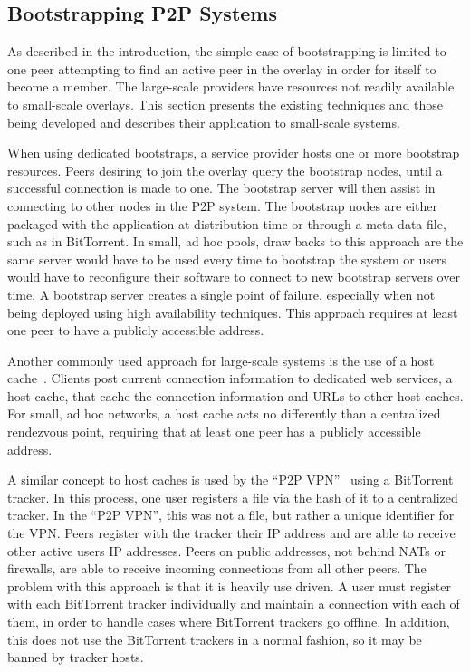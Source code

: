 \documentclass[conference]{IEEEtran}
\begin{document}
\subsection{Bootstrapping P2P Systems}

As described in the introduction, the simple case of bootstrapping is limited
to one peer attempting to find an active peer in the overlay in order for
itself to become a member.  The large-scale providers have resources not
readily available to small-scale overlays.  This section presents the existing
techniques and those being developed and describes their application to
small-scale systems.

When using dedicated bootstraps, a service provider hosts one or more bootstrap
resources.  Peers desiring to join the overlay query the bootstrap nodes, until
a successful connection is made to one.  The bootstrap server will then assist
in connecting to other nodes in the P2P system.  The bootstrap nodes are either
packaged with the application at distribution time or through a meta data file,
such as in BitTorrent.  In small, ad hoc pools, draw backs to this approach are
the same server would have to be used every time to bootstrap the system or
users would have to reconfigure their software to connect to new bootstrap
servers over time.  A bootstrap server creates a single point of failure,
especially when not being deployed using high availability techniques.  This
approach requires at least one peer to have a publicly accessible address.

Another commonly used approach for large-scale systems is the use of a host
cache~\cite{host_cache}.  Clients post current connection information to
dedicated web services, a host cache, that cache the connection information and
URLs to other host caches.  For small, ad hoc networks, a host cache acts no
differently than a centralized rendezvous point, requiring that at least one
peer has a publicly accessible address.

A similar concept to host caches is used by the ``P2P VPN''~\cite{p2pvpn} using
a BitTorrent tracker.  In this process, one user registers a file via the hash
of it to a centralized tracker.  In the ``P2P VPN'', this was not a file, but
rather a unique identifier for the VPN.  Peers register with the tracker their
IP address and are able to receive other active users IP addresses.  Peers on
public addresses, not behind NATs or firewalls, are able to receive incoming
connections from all other peers.  The problem with this approach is that it is
heavily use driven.  A user must register with each BitTorrent tracker
individually and maintain a connection with each of them, in order to handle
cases where BitTorrent trackers go offline.  In addition, this does not use the
BitTorrent trackers in a normal fashion, so it may be banned by tracker hosts.
\end{document}
